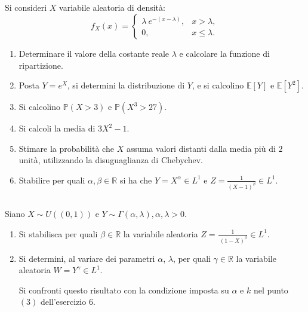 \subsection{}

Si consideri $X$ variabile aleatoria di densità:
\begin{equation*}
f_{X}\left( x\right) =\begin{cases}
\lambda \ e^{-\left( x-\lambda \right)} , & x >\lambda ,\\
0, & x\leq \lambda .
\end{cases}
\end{equation*}
\begin{enumerate}
\item Determinare il valore della costante reale $\lambda $ e calcolare la funzione di ripartizione.
\item Posta $Y=e^{X}$, si determini la distribuzione di $Y$, e si calcolino $\mathbb{E}\left[ Y\right]$ e $\mathbb{E}\left[ Y^{2}\right]$.
\item Si calcolino $\mathbb{P}\left( X >3\right)$ e $\mathbb{P}\left( X^{3}  >27\right)$.
\item Si calcoli la media di $3X^{2} -1$.
\item Stimare la probabilità che $X$ assuma valori distanti dalla media più di $2$ unità, utilizzando la disuguaglianza di Chebychev.
\item Stabilire per quali $\alpha ,\beta \in \mathbb{R}$ si ha che $Y=X^{\alpha } \in L^{1}$ e $Z=\frac{1}{\left( X-1\right)^{\beta }} \in L^{1}$.
\end{enumerate}
\subsection{}

Siano $X\sim U\left(\left( 0,1\right)\right)$ e $Y\sim \Gamma \left( \alpha ,\lambda \right) ,\alpha ,\lambda  >0$.
\begin{enumerate}
\item Si stabilisca per quali $\beta \in \mathbb{R}$ la variabile aleatoria $Z=\frac{1}{\ \left( 1-X\right)^{\beta }} \in L^{1}$.
\item Si determini, al variare dei parametri $\alpha $, $\lambda $, per quali $\gamma \in \mathbb{R}$ la variabile aleatoria $W=Y^{\gamma } \in L^{1}$.

Si confronti questo risultato con la condizione imposta su $\alpha $ e $k$ nel punto $\left( 3\right)$ dell'esercizio $6$.
\end{enumerate}
